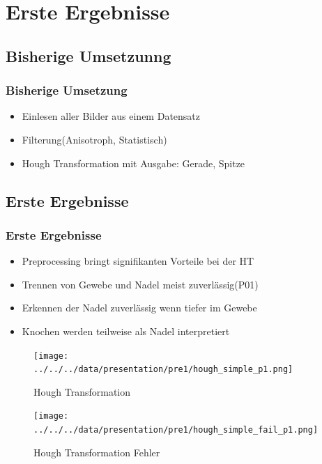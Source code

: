 \documentclass[11pt]{beamer}
\begin{document}
\section{Erste Ergebnisse}
\subsection{Bisherige Umsetzunng}
\begin{frame}
\frametitle{Bisherige Umsetzung}
\begin{itemize}
\item Einlesen aller Bilder aus einem Datensatz
\item Filterung(Anisotroph, Statistisch)
\item Hough Transformation mit Ausgabe: Gerade, Spitze
\end{itemize}
\end{frame}

\subsection{Erste Ergebnisse}
\begin{frame}[allowframebreaks]
\frametitle{Erste Ergebnisse}
\begin{itemize}
\item Preprocessing bringt signifikanten Vorteile bei der HT
\item Trennen von Gewebe und Nadel meist zuverlässig(P01)
\item Erkennen der Nadel zuverlässig wenn tiefer im Gewebe
\item Knochen werden teilweise als Nadel interpretiert
\end{itemize}


\framebreak
\begin{figure}[H]
\centering
\texttt{[image: ../../../data/presentation/pre1/hough\_simple\_p1.png]}
\caption{Hough Transformation}
\end{figure}

\framebreak
\begin{figure}[H]
\centering
\texttt{[image: ../../../data/presentation/pre1/hough\_simple\_fail\_p1.png]}
\caption{Hough Transformation Fehler}
\end{figure}

\end{frame}

\end{document}
